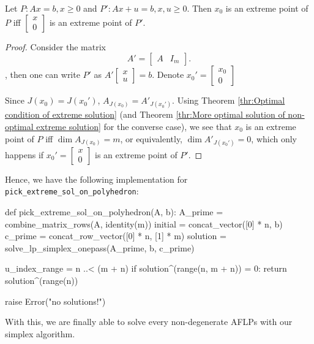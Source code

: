 \begin{theorem}
\label{thr:Extreme solution of slacked program}
  Let \( P: Ax = b, x \ge 0 \) and \( P': Ax + u = b, x, u \ge 0 \). Then \(
  x_{0} \) is an extreme point of \( P \) iff \( \begin{bmatrix} x \\ 0 \end{bmatrix}  \) is an extreme
  point of \( P' \).
\end{theorem}

\begin{proof}
  Consider the matrix
  \[
    A' = \begin{bmatrix} A & I_{m} \end{bmatrix}
  .\], then one can write \( P' \) as \( A'\begin{bmatrix} x \\ u \end{bmatrix}
  = b\). Denote \( x_{0}' = \begin{bmatrix} x_{0} \\ 0 \end{bmatrix}  \)

  Since \( J(x_{0}) = J(x_{0}')  \), \( A_{J(x_{0})} =
  A'_{J(x_{0}')} \). Using Theorem \ref{thr:Optimal condition of extreme
solution} (and Theorem \ref{thr:More optimal solution of non-optimal extreme
solution} for the converse case), we see that \( x_{0} \) is an extreme point of
\( P \) iff \( \dim A_{J(x_{0})}
= m\), or equivalently, \( \dim A'_{J( x_{0}' )} = 0 \), which only happens if
\( x_{0}' = \begin{bmatrix} x \\ 0 \end{bmatrix}  \) is an extreme point of \(
P' \).
\end{proof}

Hence, we have the following implementation for
\verb|pick_extreme_sol_on_polyhedron|:

\begin{python}
def pick_extreme_sol_on_polyhedron(A, b):
  A_prime = combine_matrix_rows(A, identity(m))
  initial = concat_vector([0] * n, b)
  c_prime = concat_row_vector([0] * n, [1] * m)
  solution = solve_lp_simplex_onepass(A_prime, b, c_prime)

  u_index_range = n ..< (m + n)
  if solution^(range(n, m + n)) = 0:
    return solution^(range(n))
  
  raise Error("no solutions!")
\end{python}

With this, we are finally able to solve every non-degenerate AFLPs with our
simplex algorithm.

